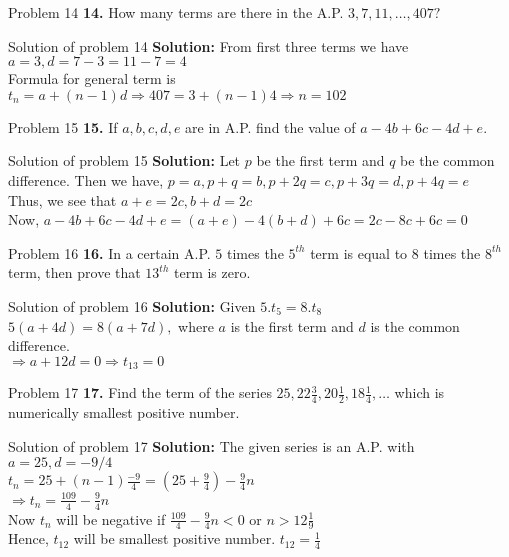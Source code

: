 \documentclass[aspectratio=1610,8pt]{beamer}
\begin{document}
\begin{frame}{Problem 14}
  \textbf{14.} How many terms are there in the A.P. $3, 7, 11, \ldots, 407?$
\end{frame}
\begin{frame}{Solution of problem 14}
  \textbf{Solution:} From first three terms we have $a = 3, d = 7 - 3 = 11 - 7
  = 4$\\
  Formula for general term is $t_n = a + (n - 1)d\Rightarrow 407 = 3 + (n - 1)4
  \Rightarrow n = 102$
\end{frame}
\begin{frame}{Problem 15}
  \textbf{15.} If $a, b, c, d, e$ are in A.P. find the value of $a - 4b + 6c -
  4d + e.$
\end{frame}
\begin{frame}{Solution of problem 15}
  \textbf{Solution:} Let $p$ be the first term and $q$ be the common
  difference. Then we have,
  $p = a, p + q = b, p + 2q = c, p + 3q = d, p + 4q = e$\\
  Thus, we see that $a + e = 2c, b + d = 2c$\\
  Now, $a - 4b + 6c - 4d + e = (a + e) - 4(b + d) + 6c = 2c - 8c + 6c = 0$
\end{frame}
\begin{frame}{Problem 16}
  \textbf{16.} In a certain A.P. $5$ times the $5^{th}$ term is equal to $8$
  times the $8^{th}$ term, then prove that $13^{th}$ term is zero.
\end{frame}
\begin{frame}{Solution of problem 16}
  \textbf{Solution:} Given $5.t_5 = 8.t_8$\\
  $5(a + 4d) = 8(a + 7d),$ where $a$ is the first term and $d$ is the common
  difference.\\
  $\Rightarrow a + 12d = 0 \Rightarrow t_{13} = 0$
\end{frame}
\begin{frame}{Problem 17}
  \textbf{17.} Find the term of the series $25, 22\frac{3}{4}, 20\frac{1}{2},
  18\frac{1}{4}, \ldots$ which is numerically smallest positive number.
\end{frame}
\begin{frame}{Solution of problem 17}
  \textbf{Solution:} The given series is an A.P. with $a = 25, d = -9/4$\\
  $t_n = 25 + (n - 1)\frac{-9}{4} = \left(25 + \frac{9}{4}\right) -
  \frac{9}{4}n$\\
  $\Rightarrow t_n = \frac{109}{4} - \frac{9}{4}n$\\
  Now $t_n$ will be negative if $\frac{109}{4} - \frac{9}{4}n < 0$ or $n > 12\frac{1}{9}$\\
  Hence, $t_{12}$ will be smallest positive number. $t_{12} = \frac{1}{4}$
\end{frame}
\end{document}
